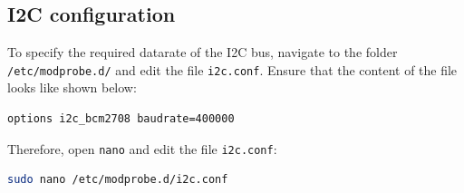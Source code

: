 \subsection*{I2C configuration}
To specify the required datarate of the I2C bus, navigate to the folder \texttt{/etc/modprobe.d/} and edit the file \texttt{i2c.conf}. Ensure that the content of the file looks like shown below:
\begin{lstlisting}[language=bash,otherkeywords={make,scp,sudo,nano}]
options i2c_bcm2708 baudrate=400000
\end{lstlisting}

Therefore, open \texttt{nano} and edit the file \texttt{i2c.conf}:
\begin{lstlisting}[language=bash,otherkeywords={make,scp,sudo,nano}]
sudo nano /etc/modprobe.d/i2c.conf
\end{lstlisting}
